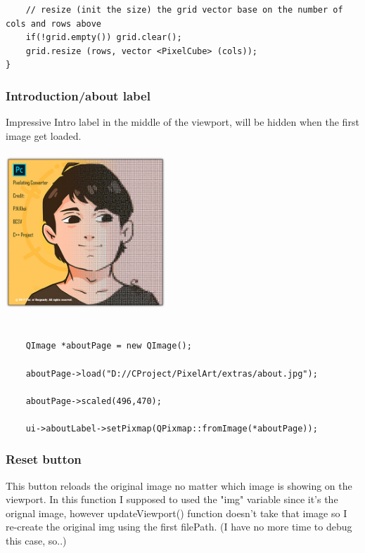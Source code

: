 \documentclass[english]{article}
\begin{document}
{\begin{lstlisting}
	// resize (init the size) the grid vector base on the number of cols and rows above
	if(!grid.empty()) grid.clear();
	grid.resize (rows, vector <PixelCube> (cols));
}

\end{lstlisting}


\subsubsection{Introduction/about label}

Impressive Intro label in the middle of the viewport, will be hidden when the first image get loaded.


\begin{center}
	\includegraphics[width=6cm,height=6cm]{img/about.jpg}	
\end{center}  

\lstset{language=C++}
\begin{lstlisting}

	QImage *aboutPage = new QImage();
	
	aboutPage->load("D://CProject/PixelArt/extras/about.jpg");
	
	aboutPage->scaled(496,470);
	
	ui->aboutLabel->setPixmap(QPixmap::fromImage(*aboutPage));

\end{lstlisting}



\subsubsection{Reset button}

This button reloads the original image no matter which image is showing on the viewport. In this function I supposed to used the "img" variable since it's the orignal image, however updateViewport() function doesn't take that image so I re-create the original img using the first filePath. (I have no more time to debug this case, so..)

}
\end{document}
